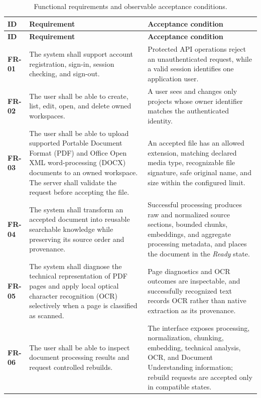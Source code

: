 {\small
\begin{longtable}{@{}L{1.2cm}L{7.9cm}L{4.6cm}@{}}
\caption[Functional requirements]{Functional requirements and observable acceptance conditions.}
\label{tab:functional-requirements}\\
\toprule
\textbf{ID} & \textbf{Requirement} & \textbf{Acceptance condition} \\
\midrule
\endfirsthead
\toprule
\textbf{ID} & \textbf{Requirement} & \textbf{Acceptance condition} \\
\midrule
\endhead
\bottomrule
\endfoot
\textbf{FR-01} &
The system shall support account registration, sign-in, session checking, and
sign-out. &
Protected API operations reject an unauthenticated request, while a valid
session identifies one application user. \\

\textbf{FR-02} &
The user shall be able to create, list, edit, open, and delete owned workspaces. &
A user sees and changes only projects whose owner identifier matches the
authenticated identity. \\

\textbf{FR-03} &
The user shall be able to upload supported Portable Document Format (PDF) and
Office Open XML word-processing (DOCX) documents to an owned workspace. The
server shall validate the request before accepting the file. &
An accepted file has an allowed extension, matching declared media type,
recognizable file signature, safe original name, and size within the configured
limit. \\

\textbf{FR-04} &
The system shall transform an accepted document into reusable searchable
knowledge while preserving its source order and provenance. &
Successful processing produces raw and normalized source sections, bounded
chunks, embeddings, and aggregate processing metadata, and places the document
in the \emph{Ready} state. \\

\textbf{FR-05} &
The system shall diagnose the technical representation of PDF pages and apply
local optical character recognition (OCR) selectively when a page is classified
as scanned. &
Page diagnostics and OCR outcomes are inspectable, and successfully recognized
text records OCR rather than native extraction as its provenance. \\

\textbf{FR-06} &
The user shall be able to inspect document processing results and request
controlled rebuilds. &
The interface exposes processing, normalization, chunking, embedding, technical
analysis, OCR, and Document Understanding information; rebuild requests are
accepted only in compatible states. \\


\end{longtable}}
